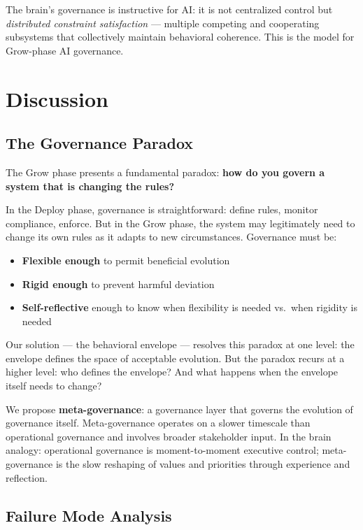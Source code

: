 \documentclass[11pt,a4paper]{article}
\begin{document}
The brain's governance is instructive for AI: it is not centralized control but \emph{distributed constraint satisfaction} --- multiple competing and cooperating subsystems that collectively maintain behavioral coherence. This is the model for Grow-phase AI governance.

\section{Discussion}

\subsection{The Governance Paradox}

The Grow phase presents a fundamental paradox: \textbf{how do you govern a system that is changing the rules?}

In the Deploy phase, governance is straightforward: define rules, monitor compliance, enforce. But in the Grow phase, the system may legitimately need to change its own rules as it adapts to new circumstances. Governance must be:
\begin{itemize}[nosep]
    \item \textbf{Flexible enough} to permit beneficial evolution
    \item \textbf{Rigid enough} to prevent harmful deviation
    \item \textbf{Self-reflective} enough to know when flexibility is needed vs.\ when rigidity is needed
\end{itemize}

Our solution --- the behavioral envelope --- resolves this paradox at one level: the envelope defines the space of acceptable evolution. But the paradox recurs at a higher level: who defines the envelope? And what happens when the envelope itself needs to change?

We propose \textbf{meta-governance}: a governance layer that governs the evolution of governance itself. Meta-governance operates on a slower timescale than operational governance and involves broader stakeholder input. In the brain analogy: operational governance is moment-to-moment executive control; meta-governance is the slow reshaping of values and priorities through experience and reflection.

\subsection{Failure Mode Analysis}
\end{document}
